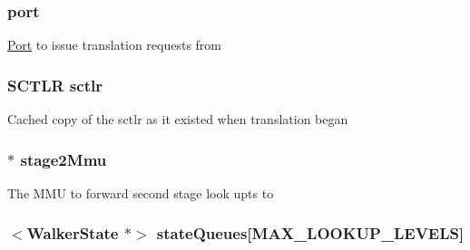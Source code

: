 \label{classArmISA_1_1TableWalker_af85538fbb375410b2750035ab34dc88a}
\hypertarget{classArmISA_1_1TableWalker_a9305ff92238d7360a5ee86168e00407b}{
\subsubsection[{port}]{ {\bf port}}}
\label{classArmISA_1_1TableWalker_a9305ff92238d7360a5ee86168e00407b}
\hyperlink{classPort}{Port} to issue translation requests from \hypertarget{classArmISA_1_1TableWalker_a43c4d132ca97c6cc5358f7be3c2b5a69}{
\subsubsection[{sctlr}]{\setlength{\rightskip}{0pt plus 5cm}SCTLR {\bf sctlr}}}
\label{classArmISA_1_1TableWalker_a43c4d132ca97c6cc5358f7be3c2b5a69}
Cached copy of the sctlr as it existed when translation began \hypertarget{classArmISA_1_1TableWalker_a21ea64a0a6d9600fb09fff0854fd55d7}{
\subsubsection[{stage2Mmu}]{$\ast$ {\bf stage2Mmu}}}
\label{classArmISA_1_1TableWalker_a21ea64a0a6d9600fb09fff0854fd55d7}
The MMU to forward second stage look upts to \hypertarget{classArmISA_1_1TableWalker_af819b2b862d892da5df10248b6d72787}{
\subsubsection[{stateQueues}]{$<${\bf WalkerState} $\ast$$>$ {\bf stateQueues}\mbox{[}MAX\_\-LOOKUP\_\-LEVELS\mbox{]}}}
